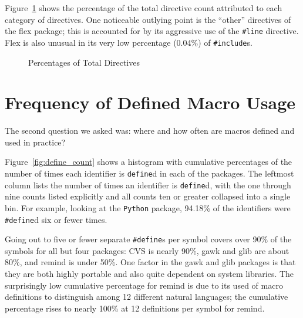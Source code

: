 Figure~\ref{fig:total_directives} shows the percentage of the total
directive count attributed to each category of directives.  One
noticeable outlying point is the ``other'' directives of the flex
package; this is accounted for by its aggressive use of the
\verb+#line+ directive.  Flex is also unusual in its very low
percentage (0.04\%) of \verb+#include+s.

\begin{figure}
\vspace{4.5in}
\caption{Percentages of Total Directives\label{fig:total_directives}}
\end{figure}

\section{Frequency of Defined Macro Usage}\label{sec:usage}

The second question we asked was: where and how often are macros
defined and used in practice?  

%
%


Figure~\ref{fig:define_count} shows a histogram with cumulative
percentages of the number of times each identifier is \verb+define+d
in each of the packages.  The leftmost column lists the number of
times an identifier is \verb+define+d, with the one through nine counts
listed explicitly and all counts ten or greater collapsed into a
single bin.  
For example, looking at the \verb+Python+ package, 94.18\% of
the identifiers were \verb+#define+d six or fewer times.  

Going out to five or fewer separate \verb+#define+s per symbol covers
over 90\% of the symbols for all but four packages: CVS is nearly
90\%, gawk and glib are about 80\%, and remind is under 50\%.  One
factor in the gawk and glib packages is that they are both highly
portable and also quite dependent on system libraries.  The
surprisingly low cumulative percentage for remind is due to its used
of macro definitions to distinguish among 12 different natural
languages; the cumulative percentage rises to nearly 100\% at 12
definitions per symbol for remind.  

